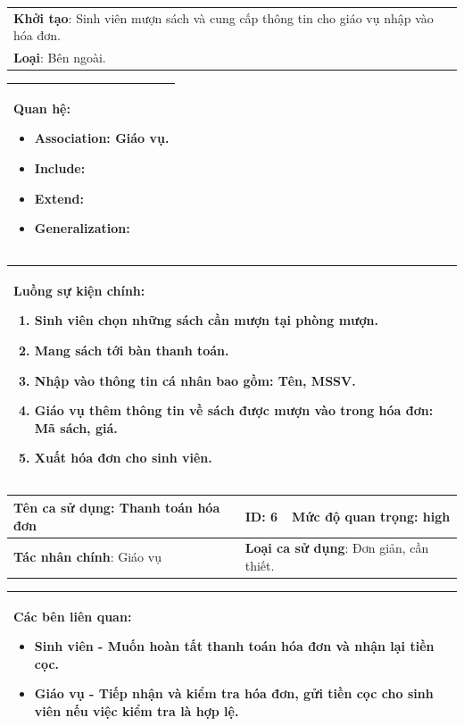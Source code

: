 \documentclass[12pt]{report}
\begin{document}
\begin{center}
\begin{tabular}{| m{15.9cm} |}
    \hline
    \textbf{Khởi tạo}: Sinh viên mượn sách và cung cấp thông tin cho giáo vụ nhập vào hóa đơn. \\
    \textbf{Loại}: Bên ngoài.  \\
    \hline
\end{tabular}

\begin{tabular}{| m{15.9cm} |}
    \hline
    \textbf{Quan hệ}:
    \begin{itemize}
        \item Association: Giáo vụ. 
        \item Include: 
        \item Extend: 
        \item Generalization: 
    \end{itemize} \\
    \hline
\end{tabular}

\begin{tabular}{| m{15.9cm} |}
    \hline
    \textbf{Luồng sự kiện chính}:
    \begin{enumerate}
        \item Sinh viên chọn những sách cần mượn tại phòng mượn. 
        \item Mang sách tới bàn thanh toán. 
        \item Nhập vào thông tin cá nhân bao gồm: Tên, MSSV. 
        \item Giáo vụ thêm thông tin về sách được mượn vào trong hóa đơn: Mã sách, giá. 
        \item Xuất hóa đơn cho sinh viên. 
    \end{enumerate} \\
    \hline
\end{tabular}

\newpage
\begin{tabular}{| m{6cm} | m{3cm} | m{6cm} |}
    \hline
    \textbf{Tên ca sử dụng}: Thanh toán hóa đơn & \textbf{ID}: 6 & \textbf{Mức độ quan trọng}: high \\
    \hline
    \textbf{Tác nhân chính}: Giáo vụ & \multicolumn{2}{|l|}{\textbf{Loại ca sử dụng}: Đơn giản, cần thiết.} \\
    \hline
\end{tabular}
\begin{tabular}{| m{15.9cm} |}
    \hline
        \textbf{Các bên liên quan:} 
        \begin{itemize}
            \item Sinh viên - Muốn hoàn tất thanh toán hóa đơn và nhận lại tiền cọc. 
            \item Giáo vụ - Tiếp nhận và kiểm tra hóa đơn, gửi tiền cọc cho sinh viên nếu việc kiểm tra là hợp lệ. 
        \end{itemize} \\
    \hline
\end{tabular}


\end{center}
\end{document}
